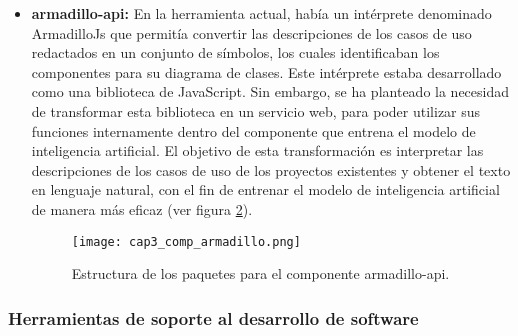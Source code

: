 \begin{itemize}
	\begin{figure}[H]  
		\centering
		\texttt{[image: cap3\_diagrama\_flujo\_proceso\_b.png]}
		\caption{Uso de los modelos entrenados por OpenAI.}
		\label{fig:cap3_diagrama_flujo_proceso_b}
	\end{figure}
	
	Para utilizar un modelo entrenado, es fundamental contar con un modelo base previamente entrenado con los datos extraídos de la herramienta. En la figura \ref{fig:cap3_diagrama_flujo_proceso_b} se muestra el proceso paso a paso que se sigue para garantizar el correcto funcionamiento de la extensión y su uso eficiente con la API de OpenAI. El proceso es muy similar al anterior con la deferencia que existe un paso denominado \texttt{Obtener mensaje promt}. Este paso contiene el texto redactado en lenguaje natural y ademas 1 mensaje en especifico detallando lo que debe realizar el modelo entrenado. 
	
	\item \textbf{armadillo-api: } En la herramienta actual, había un intérprete denominado ArmadilloJs que permitía convertir las descripciones de los casos de uso redactados en un conjunto de símbolos, los cuales identificaban los componentes para su diagrama de clases. Este intérprete estaba desarrollado como una biblioteca de JavaScript. Sin embargo, se ha planteado la necesidad de transformar esta biblioteca en un servicio web, para poder utilizar sus funciones internamente dentro del componente que entrena el modelo de inteligencia artificial. El objetivo de esta transformación es interpretar las descripciones de los casos de uso de los proyectos existentes y obtener el texto en lenguaje natural, con el fin de entrenar el modelo de inteligencia artificial de manera más eficaz (ver figura \ref{fig:cap3_comp_armadillo}). 
	
	\begin{figure}[H]  
		\centering
		\texttt{[image: cap3\_comp\_armadillo.png]}
		\caption{Estructura de los paquetes para el componente armadillo-api.}
		\label{fig:cap3_comp_armadillo}
	\end{figure}
	
\end{itemize}

\subsubsection{Herramientas de soporte al desarrollo de software}

